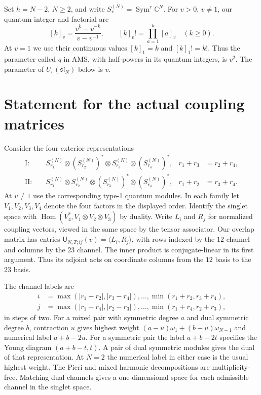 \documentclass[10pt,a4paper]{article}
\newcommand{\Sym}{\operatorname{Sym}}
\newcommand{\Hom}{\operatorname{Hom}}
\newcommand{\qf}[1]{[#1]_v!}
\begin{document}
\medskip
Set $h=N-2$, $N\ge2$, and write $S_r^{(N)}=\Sym^r\mathbb C^N$.
For $v>0$, $v\ne1$, our quantum integer and factorial are
\[
 [k]_v=\frac{v^k-v^{-k}}{v-v^{-1}},\qquad
 \qf{k}=\prod_{a=1}^k[a]_v\quad(k\ge0).
\]
At $v=1$ we use their continuous values $[k]_1=k$ and $[k]_1!=k!$.
Thus the parameter called $q$ in AMS, with half-powers in its quantum integers,
is $v^2$. The parameter of $U_v(\mathfrak{sl}_N)$ below is $v$.

\section{Statement for the actual coupling matrices}
Consider the four exterior representations
\begin{align}
\mathrm I:\quad&
 S_{r_1}^{(N)}\otimes(S_{r_2}^{(N)})^*\otimes
 S_{r_3}^{(N)}\otimes(S_{r_4}^{(N)})^*,
 &r_1+r_3&=r_2+r_4,\label{eq:typeI}\\
\mathrm {II}:\quad&
 S_{r_1}^{(N)}\otimes S_{r_2}^{(N)}\otimes
 (S_{r_3}^{(N)})^*\otimes(S_{r_4}^{(N)})^*,
 &r_1+r_2&=r_3+r_4.\label{eq:typeII}
\end{align}
At $v\ne1$ use the corresponding type-1 quantum modules. In each
family let $V_1,V_2,V_3,V_4$ denote the four factors in the displayed order.
Identify the singlet space with $\Hom(V_4^*,V_1\otimes V_2\otimes V_3)$
by duality. Write $L_i$ and $R_j$ for normalized coupling vectors, viewed
in the same space by the tensor associator. Our overlap matrix has entries
$\mathsf U_{N,T;ij}(v)=\langle L_i,R_j\rangle$, with rows indexed by the
$12$ channel and columns by the $23$ channel. The inner product is
conjugate-linear in its first argument. Thus its adjoint acts on coordinate
columns from the $12$ basis to the $23$ basis.

The channel labels are
\begin{align*}
 i&=\max(|r_1-r_2|,|r_3-r_4|),\ldots,
       \min(r_1+r_2,r_3+r_4),\\
 j&=\max(|r_1-r_4|,|r_2-r_3|),\ldots,
       \min(r_1+r_4,r_2+r_3),
\end{align*}
in steps of two. For a mixed pair with symmetric degree $a$ and dual
symmetric degree $b$, contraction $u$ gives highest weight
$(a-u)\omega_1+(b-u)\omega_{N-1}$ and numerical label $a+b-2u$.
For a symmetric pair the label $a+b-2t$ specifies the Young diagram
$(a+b-t,t)$. A pair of dual symmetric modules gives the dual of that
representation. At $N=2$ the numerical label in either case is the
usual highest weight. The Pieri and mixed harmonic decompositions are
multiplicity-free. Matching dual channels gives a one-dimensional space
for each admissible channel in the singlet space.
\end{document}
